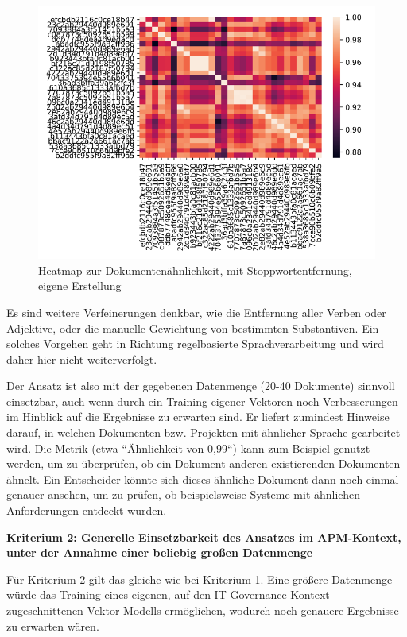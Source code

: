 \begin{figure}[h]
\centering
\includegraphics[scale=0.95]{content/pics/Picture_13.png}
\caption{Heatmap zur Dokumentenähnlichkeit, mit Stoppwortentfernung, eigene Erstellung}
\label{Abbildung:heatmap2}
\end{figure}

Es sind weitere Verfeinerungen denkbar, wie die Entfernung aller Verben oder Adjektive, oder die manuelle Gewichtung von bestimmten Substantiven. Ein solches Vorgehen geht in Richtung regelbasierte Sprachverarbeitung und wird daher hier nicht weiterverfolgt. 

Der Ansatz ist also mit der gegebenen Datenmenge (20-40 Dokumente) sinnvoll einsetzbar, auch wenn durch ein Training eigener Vektoren noch Verbesserungen im Hinblick auf die Ergebnisse zu erwarten sind. Er liefert zumindest Hinweise darauf, in welchen Dokumenten bzw. Projekten mit ähnlicher Sprache gearbeitet wird.
Die Metrik (etwa ``Ähnlichkeit von 0,99``) kann zum Beispiel genutzt werden, um zu überprüfen, ob ein Dokument anderen existierenden Dokumenten ähnelt. Ein Entscheider könnte sich dieses ähnliche Dokument dann noch einmal genauer ansehen, um zu prüfen, ob beispielsweise Systeme mit ähnlichen Anforderungen entdeckt wurden.

{\bf Kriterium 2: Generelle Einsetzbarkeit des Ansatzes im APM-Kontext, unter der Annahme einer beliebig großen Datenmenge}

Für Kriterium 2 gilt das gleiche wie bei Kriterium 1. Eine größere Datenmenge würde das Training eines eigenen, auf den IT-Governance-Kontext zugeschnittenen Vektor-Modells ermöglichen, wodurch noch genauere Ergebnisse zu erwarten wären.

